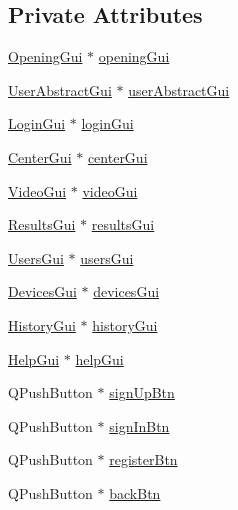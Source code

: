 \subsection*{Private Attributes}
\begin{DoxyCompactItemize}
\item 
\hyperlink{class_opening_gui}{Opening\-Gui} $\ast$ \hyperlink{class_master_gui_a2dba24deae06de661e132be0a2030829}{opening\-Gui}
\item 
\hyperlink{class_user_abstract_gui}{User\-Abstract\-Gui} $\ast$ \hyperlink{class_master_gui_ad43d7e616be991aeb2daca46193591b6}{user\-Abstract\-Gui}
\item 
\hyperlink{class_login_gui}{Login\-Gui} $\ast$ \hyperlink{class_master_gui_a8ea61f0f1c30c7e7544261ae3c42aa71}{login\-Gui}
\item 
\hyperlink{class_center_gui}{Center\-Gui} $\ast$ \hyperlink{class_master_gui_ab23b51673ab5ab0ff0310060491c1865}{center\-Gui}
\item 
\hyperlink{class_video_gui}{Video\-Gui} $\ast$ \hyperlink{class_master_gui_a14fd414cca6a387601c408367e37a17d}{video\-Gui}
\item 
\hyperlink{class_results_gui}{Results\-Gui} $\ast$ \hyperlink{class_master_gui_a8e08570b318c97eefa367445490bc017}{results\-Gui}
\item 
\hyperlink{class_users_gui}{Users\-Gui} $\ast$ \hyperlink{class_master_gui_a4a314e7fef28e27227053b92eaad6b0c}{users\-Gui}
\item 
\hyperlink{class_devices_gui}{Devices\-Gui} $\ast$ \hyperlink{class_master_gui_a2803cbba31ddd8200f1e80477b4adcf5}{devices\-Gui}
\item 
\hyperlink{class_history_gui}{History\-Gui} $\ast$ \hyperlink{class_master_gui_a586f326835930b130a4263c703468f58}{history\-Gui}
\item 
\hyperlink{class_help_gui}{Help\-Gui} $\ast$ \hyperlink{class_master_gui_a79af6b544a8260562f4aad77b04dc2dc}{help\-Gui}
\item 
Q\-Push\-Button $\ast$ \hyperlink{class_master_gui_a0b4ddda3b20813ac902b738baae4124a}{sign\-Up\-Btn}
\item 
Q\-Push\-Button $\ast$ \hyperlink{class_master_gui_a8b3fc4f2269e8008029324f3db8ffd0d}{sign\-In\-Btn}
\item 
Q\-Push\-Button $\ast$ \hyperlink{class_master_gui_a3ebebfb6aa22009a1850e639a05d7ea1}{register\-Btn}
\item 
Q\-Push\-Button $\ast$ \hyperlink{class_master_gui_a4a80f25f8b78be209097d40c0d0f012b}{back\-Btn}
\item 

\end{DoxyCompactItemize}
